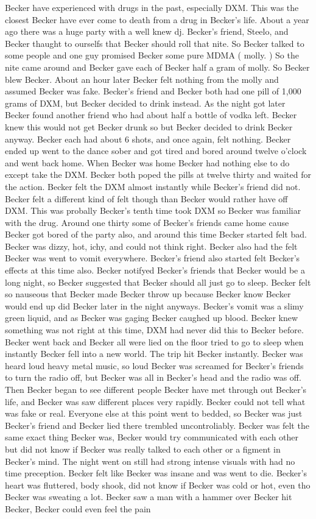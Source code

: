 \documentclass[12pt]{book}
\begin{document}
Becker have experienced with drugs in the past, especially DXM. This was the closest Becker have ever come to death from a drug in Becker's life. About a year ago there was a huge party with a well knew dj. Becker's friend, Steelo, and Becker thaught to ourselfs that Becker should roll that nite. So Becker talked to some people and one guy promised Becker some pure MDMA ( molly. ) So the nite came around and Becker gave each of Becker half a gram of molly. So Becker blew Becker. About an hour later Becker felt nothing from the molly and assumed Becker was fake. Becker's friend and Becker both had one pill of 1,000 grams of DXM, but Becker decided to drink instead. As the night got later Becker found another friend who had about half a bottle of vodka left. Becker knew this would not get Becker drunk so but Becker decided to drink Becker anyway. Becker each had about 6 shots, and once again, felt nothing. Becker ended up went to the dance sober and got tired and bored around twelve o'clock and went back home. When Becker was home Becker had nothing else to do except take the DXM. Becker both poped the pills at twelve thirty and waited for the action. Becker felt the DXM almost instantly while Becker's friend did not. Becker felt a different kind of felt though than Becker would rather have off DXM. This was probally Becker's tenth time took DXM so Becker was familiar with the drug. Around one thirty some of Becker's friends came home cause Becker got bored of the party also, and around this time Becker started felt bad. Becker was dizzy, hot, ichy, and could not think right. Becker also had the felt Becker was went to vomit everywhere. Becker's friend also started felt Becker's effects at this time also. Becker notifyed Becker's friends that Becker would be a long night, so Becker suggested that Becker should all just go to sleep. Becker felt so nauseous that Becker made Becker throw up because Becker know Becker would end up did Becker later in the night anyways. Becker's vomit was a slimy green liquid, and as Becker was gaging Becker caughed up blood. Becker knew something was not right at this time, DXM had never did this to Becker before. Becker went back and Becker all were lied on the floor tried to go to sleep when instantly Becker fell into a new world. The trip hit Becker instantly. Becker was heard loud heavy metal music, so loud Becker was screamed for Becker's friends to turn the radio off, but Becker was all in Becker's head and the radio was off. Then Becker began to see different people Becker have met through out Becker's life, and Becker was saw different places very rapidly. Becker could not tell what was fake or real. Everyone else at this point went to bedded, so Becker was just Becker's friend and Becker lied there trembled uncontroliably. Becker was felt the same exact thing Becker was, Becker would try communicated with each other but did not know if Becker was really talked to each other or a figment in Becker's mind. The night went on still had strong intense visuals with had no time preception. Becker felt like Becker was insane and was went to die. Becker's heart was fluttered, body shook, did not know if Becker was cold or hot, even tho Becker was sweating a lot. Becker saw a man with a hammer over Becker hit Becker, Becker could even feel the pain 
\end{document}
